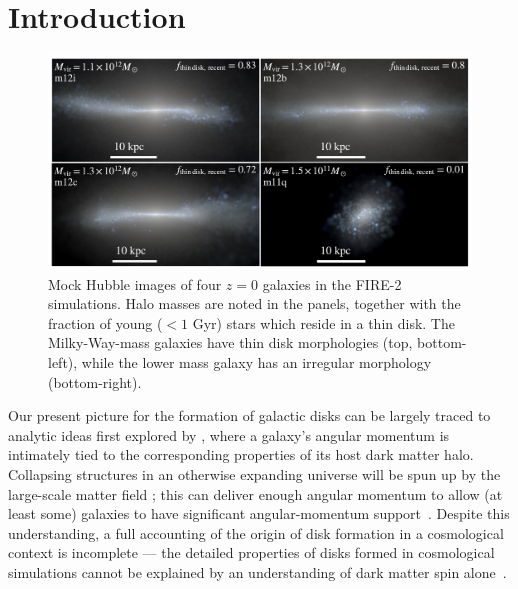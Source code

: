 \documentclass[fleqn,usenatbib]{mnras}
\begin{document}


\section{Introduction}
\label{s: introduction}

\begin{figure}
    \centering
    \includegraphics[width=\textwidth]{figures/stars.pdf}
    \caption{
    Mock Hubble images of four $z=0$ galaxies in the FIRE-2 simulations. Halo masses are noted in the panels, together with the fraction of young ($<1$ Gyr) stars which reside in a thin disk.  The Milky-Way-mass galaxies have thin disk morphologies (top, bottom-left), while the lower mass galaxy has an irregular morphology (bottom-right).
    }
    \label{f: stars}
\end{figure}

Our present picture for the formation of galactic disks can be largely traced to analytic ideas first explored by \citet{fall1980}, where a galaxy's angular momentum is intimately tied to the corresponding properties of its host dark matter halo.
Collapsing structures in an otherwise expanding universe will be spun up by the large-scale matter field \citep{Peebles69};
this can deliver enough angular momentum to allow (at least some) galaxies to have significant angular-momentum support~\citep[e.g.][]{MMW98}. 
Despite this understanding, a full accounting of the origin of disk formation in a cosmological context is incomplete --- the detailed properties of disks formed in cosmological simulations cannot be explained by an understanding of dark matter spin alone~\citep[e.g.][]{GK18}.  
\end{document}
